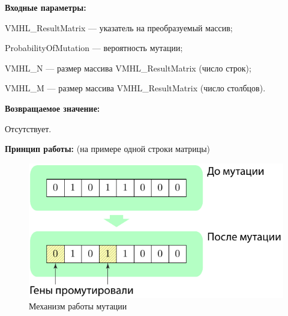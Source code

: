 \textbf{Входные параметры:}
 
VMHL\_ResultMatrix --- указатель на преобразуемый массив;
 
ProbabilityOfMutation --- вероятность мутации;
 
VMHL\_N --- размер массива VMHL\_ResultMatrix (число строк);
 
VMHL\_M --- размер массива VMHL\_ResultMatrix (число столбцов).

\textbf{Возвращаемое значение:} 

Отсутствует.

\textbf{Принцип работы:}
(на примере одной строки матрицы)

\begin{figure} [h]
  \center
  \includegraphics [scale=0.8] {TMHL_MutationBinaryMatrix_Sheme}
  \caption{Механизм работы мутации} 
  \label{img:TMHL_MutationBinaryMatrix_Sheme}  
\end{figure}
